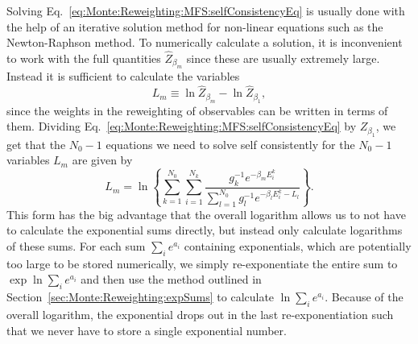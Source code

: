 Solving Eq.~\eqref{eq:Monte:Reweighting:MFS:selfConsistencyEq} is usually done with the help of an iterative solution method for non-linear
equations such as the Newton-Raphson method. To numerically calculate a solution, it is inconvenient to work with the full quantities $\hat{Z}_{\beta_m}$
since these are usually extremely large. Instead it is sufficient to calculate the variables
\begin{equation}
    \label{eq:Monte:Reweighting:MFS:logVars}
    L_m \equiv \ln \hat{Z}_{\beta_m} - \ln \hat{Z}_{\beta_1},
\end{equation}
since the weights in the reweighting of observables can be written in terms of them. Dividing Eq.~\eqref{eq:Monte:Reweighting:MFS:selfConsistencyEq} by $Z_{\beta_1}$,
we get that the $N_0-1$ equations we need to solve self consistently for the $N_0-1$ variables $L_m$ are given by
\begin{equation}
    \label{eq:Monte:Reweighting:MFS:modifiedSelfConsistencyEq}
    L_m = \ln\left\{\sum_{k=1}^{N_0}\sum_{i=1}^{N_k}\frac{g_k^{-1}e^{-\beta_mE_i^k}}{\sum_{l=1}^{N_0}g_l^{-1}e^{-\beta_lE_i^k-L_l}}\right\}.
\end{equation}
This form has the big advantage that the overall logarithm allows us to not have to calculate the exponential sums directly, but instead only calculate logarithms
of these sums. For each sum $\sum_ie^{a_i}$ containing exponentials, which are potentially too large to be stored numerically, we simply re-exponentiate the entire
sum to $\exp\ln\sum_ie^{a_i}$ and then use the method outlined in Section~\ref{sec:Monte:Reweighting:expSums} to calculate $\ln\sum_ie^{a_i}$. Because of the
overall logarithm, the exponential drops out in the last re-exponentiation such that we never have to store a single exponential number.

